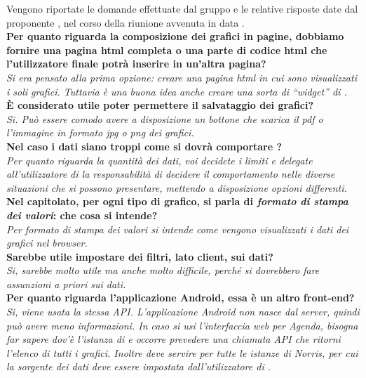 
Vengono riportate le domande effettuate dal gruppo \groupname{} e le relative risposte date dal proponente \proponente{}, nel corso della riunione avvenuta in data .\\

	\textbf{Per quanto riguarda la composizione dei grafici in pagine, dobbiamo fornire una pagina html completa o una parte di codice html che l'utilizzatore finale potrà inserire in un'altra pagina?}\\
	\textit{Si era pensato alla prima opzione: creare una pagina html in cui sono visualizzati i soli grafici. Tuttavia è una buona idea anche creare una sorta di “widget” di \projectname{}.}\\
	
	\textbf{\`{E} considerato utile poter permettere il salvataggio dei grafici?}\\
	\textit{Si. Può essere comodo avere a disposizione un bottone che scarica il pdf o l'immagine in formato jpg o png dei grafici.}\\

	\textbf{Nel caso i dati siano troppi come si dovrà comportare \projectname{}?}\\
	\textit{Per quanto riguarda la quantità dei dati, voi decidete i limiti e delegate all'utilizzatore di \projectname{} la responsabilità di decidere il comportamento nelle diverse situazioni che si possono presentare, mettendo a disposizione opzioni differenti.}\\
	
	\textbf{Nel capitolato, per ogni tipo di grafico, si parla di \textit{formato di stampa dei valori}: che cosa si intende?}\\
	\textit{Per \textit{formato di stampa dei valori} si intende come vengono visualizzati i dati dei grafici nel browser.}\\
	
	\textbf{Sarebbe utile impostare dei filtri, lato client, sui dati?}\\
	\textit{Si, sarebbe molto utile ma anche molto difficile, perché si dovrebbero fare assunzioni a priori sui dati.}\\
	
	\textbf{Per quanto riguarda l'applicazione Android, essa è un altro front-end?}\\
	\textit{Si, viene usata la stessa API. L'applicazione Android non nasce dal server, quindi può avere meno informazioni. In caso si usi l'interfaccia web per Agenda, bisogna far sapere dov'è l'istanza di \projectname{} e occorre prevedere una chiamata API che ritorni l'elenco di tutti i grafici. Inoltre deve servire per tutte le istanze di Norris, per cui la sorgente dei dati deve essere impostata dall'utilizzatore di \projectname{}.}\\

	
